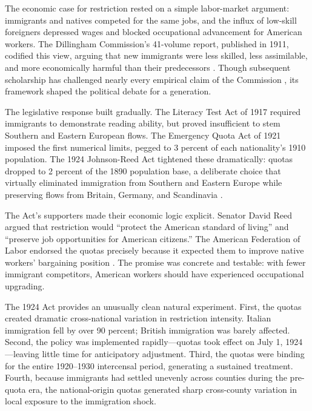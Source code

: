\documentclass[12pt]{article}
\begin{document}
The economic case for restriction rested on a simple labor-market argument: immigrants and natives competed for the same jobs, and the influx of low-skill foreigners depressed wages and blocked occupational advancement for American workers. The Dillingham Commission's 41-volume report, published in 1911, codified this view, arguing that new immigrants were less skilled, less assimilable, and more economically harmful than their predecessors \citep{dillingham1911}. Though subsequent scholarship has challenged nearly every empirical claim of the Commission \citep{abramitzky2014, abramitzky2022}, its framework shaped the political debate for a generation.

The legislative response built gradually. The Literacy Test Act of 1917 required immigrants to demonstrate reading ability, but proved insufficient to stem Southern and Eastern European flows. The Emergency Quota Act of 1921 imposed the first numerical limits, pegged to 3 percent of each nationality's 1910 population. The 1924 Johnson-Reed Act tightened these dramatically: quotas dropped to 2 percent of the 1890 population base, a deliberate choice that virtually eliminated immigration from Southern and Eastern Europe while preserving flows from Britain, Germany, and Scandinavia \citep{ngai2004, hatton2011}.

The Act's supporters made their economic logic explicit. Senator David Reed argued that restriction would ``protect the American standard of living'' and ``preserve job opportunities for American citizens.'' The American Federation of Labor endorsed the quotas precisely because it expected them to improve native workers' bargaining position \citep{goldin1994}. The promise was concrete and testable: with fewer immigrant competitors, American workers should have experienced occupational upgrading.

The 1924 Act provides an unusually clean natural experiment. First, the quotas created dramatic cross-national variation in restriction intensity. Italian immigration fell by over 90 percent; British immigration was barely affected. Second, the policy was implemented rapidly---quotas took effect on July 1, 1924---leaving little time for anticipatory adjustment. Third, the quotas were binding for the entire 1920--1930 intercensal period, generating a sustained treatment. Fourth, because immigrants had settled unevenly across counties during the pre-quota era, the national-origin quotas generated sharp cross-county variation in local exposure to the immigration shock.
\end{document}
